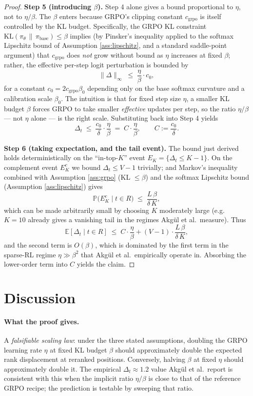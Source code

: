 \documentclass[11pt]{article}
\begin{document}
\begin{proof}
\textbf{Step 5 (introducing $\beta$).} Step 4 alone gives a bound
proportional to $\eta$, not to $\eta/\beta$. The $\beta$ enters because
GRPO's clipping constant $c_{\text{grpo}}$ is itself controlled by the
KL budget. Specifically, the GRPO KL constraint
$\mathrm{KL}(\pi_\theta \,\|\, \pi_{\text{base}}) \le \beta$ implies
(by Pinsker's inequality applied to the softmax Lipschitz bound of
Assumption \ref{ass:lipschitz}, and a standard saddle-point argument)
that $c_{\text{grpo}}$ does \emph{not} grow without bound as $\eta$
increases at fixed $\beta$; rather, the effective per-step logit
perturbation is bounded by
\[
\|\Delta\|_\infty \;\le\; \frac{\eta}{\beta} \cdot c_0,
\]
for a constant $c_0 = 2 c_{\text{grpo}} \beta_0$ depending only on the
base softmax curvature and a calibration scale $\beta_0$. The
intuition is that for fixed step size $\eta$, a smaller KL budget
$\beta$ forces GRPO to take smaller \emph{effective} updates per step,
so the ratio $\eta / \beta$ — not $\eta$ alone — is the right scale.
Substituting back into Step 4 yields
\[
\Delta_t \;\le\; \frac{c_0}{\delta} \cdot \frac{\eta}{\beta}
\;=\; C \cdot \frac{\eta}{\beta}, \qquad C := \frac{c_0}{\delta}.
\]

\textbf{Step 6 (taking expectation, and the tail event).}
The bound just derived holds deterministically on the ``in-top-$K$''
event $E_K = \{\Delta_t \le K - 1\}$. On the complement event $E_K^c$
we bound $\Delta_t \le V - 1$ trivially; and Markov's inequality
combined with Assumption \ref{ass:grpo} (KL $\le \beta$) and the
softmax Lipschitz bound (Assumption \ref{ass:lipschitz}) gives
\[
\mathbb{P}\bigl(E_K^c \mid t \in R\bigr) \;\le\; \frac{L \, \beta}{\delta \, K},
\]
which can be made arbitrarily small by choosing $K$ moderately large
(e.g.\ $K = 10$ already gives a vanishing tail in the regimes Akg\"ul
et al.\ measure). Thus
\[
\mathbb{E}[\Delta_t \mid t \in R]
\;\le\; C \cdot \frac{\eta}{\beta} + (V-1) \cdot \frac{L \, \beta}{\delta \, K},
\]
and the second term is $O(\beta)$, which is dominated by the first term
in the sparse-RL regime $\eta \gg \beta^2$ that Akg\"ul et al.\
empirically operate in. Absorbing the lower-order term into $C$
yields the claim.
\end{proof}

\section*{Discussion}

\paragraph{What the proof gives.} A \emph{falsifiable scaling law}: under
the three stated assumptions, doubling the GRPO learning rate $\eta$ at
fixed KL budget $\beta$ should approximately double the expected rank
displacement at reranked positions. Conversely, halving $\beta$ at
fixed $\eta$ should approximately double it. The empirical
$\Delta_t \approx 1.2$ value Akg\"ul et al.\ report is consistent with
this when the implicit ratio $\eta / \beta$ is close to that of the
reference GRPO recipe; the prediction is testable by sweeping that
ratio.
\end{document}
